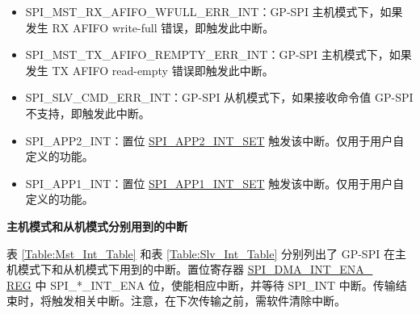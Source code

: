 \documentclass[main\_\_CN.tex]{subfiles}
\begin{document}
\begin{itemize}
\item \label{int:SPIMSTRXAFIFOWFULLERRINT}
SPI\_MST\_RX\_AFIFO\_WFULL\_ERR\_INT：GP-SPI 主机模式下，如果发生 RX AFIFO write-full 错误，即触发此中断。

\item \label{int:SPIMSTTXAFIFOREMPTYERRINT}
SPI\_MST\_TX\_AFIFO\_REMPTY\_ERR\_INT：GP-SPI 主机模式下，如果发生 TX AFIFO read-empty 错误即触发此中断。

\item \label{int:SPISLVCMDERRINT} SPI\_SLV\_CMD\_ERR\_INT：GP-SPI 从机模式下，如果接收命令值 GP-SPI 不支持，即触发此中断。

\item \label{int:SPIAPP2INT}SPI\_APP2\_INT：置位 \hyperref[fielddesc:SPIAPP1INTSET]{SPI\_APP2\_INT\_SET} 触发该中断。仅用于用户自定义的功能。
\item \label{int:SPIAPP1INT}SPI\_APP1\_INT：置位 \hyperref[fielddesc:SPIAPP1INTSET]{SPI\_APP1\_INT\_SET} 触发该中断。仅用于用户自定义的功能。

\end{itemize}

\textbf{主机模式和从机模式分别用到的中断}

表 \ref{Table:Mst_Int_Table} 和表 \ref{Table:Slv_Int_Table} 分别列出了 GP-SPI 在主机模式下和从机模式下用到的中断。置位寄存器  \hyperref[regdesc:SPIDMAINTENAREG]{SPI\_DMA\_INT\_ENA\_\\REG} 中 SPI\_*\_INT\_ENA 位，使能相应中断，并等待 SPI\_INT 中断。传输结束时，将触发相关中断。注意，在下次传输之前，需软件清除中断。
\end{document}

